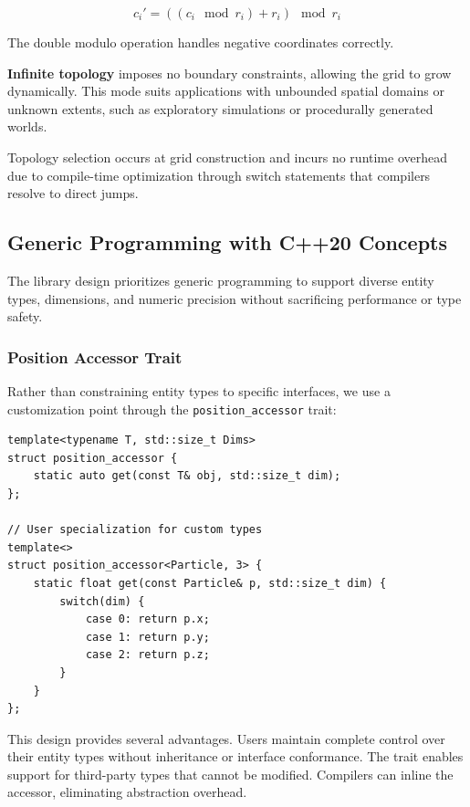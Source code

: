 \documentclass[11pt]{article}
\begin{document}
\begin{equation}
c_i' = ((c_i \mod r_i) + r_i) \mod r_i
\end{equation}

The double modulo operation handles negative coordinates correctly.

\textbf{Infinite topology} imposes no boundary constraints, allowing the grid to grow dynamically. This mode suits applications with unbounded spatial domains or unknown extents, such as exploratory simulations or procedurally generated worlds.

Topology selection occurs at grid construction and incurs no runtime overhead due to compile-time optimization through switch statements that compilers resolve to direct jumps.

\subsection{Generic Programming with C++20 Concepts}

The library design prioritizes generic programming to support diverse entity types, dimensions, and numeric precision without sacrificing performance or type safety.

\subsubsection{Position Accessor Trait}

Rather than constraining entity types to specific interfaces, we use a customization point through the \texttt{position\_accessor} trait:

\begin{lstlisting}[caption={Position accessor customization point}]
template<typename T, std::size_t Dims>
struct position_accessor {
    static auto get(const T& obj, std::size_t dim);
};

// User specialization for custom types
template<>
struct position_accessor<Particle, 3> {
    static float get(const Particle& p, std::size_t dim) {
        switch(dim) {
            case 0: return p.x;
            case 1: return p.y;
            case 2: return p.z;
        }
    }
};
\end{lstlisting}

This design provides several advantages. Users maintain complete control over their entity types without inheritance or interface conformance. The trait enables support for third-party types that cannot be modified. Compilers can inline the accessor, eliminating abstraction overhead.
\end{document}
